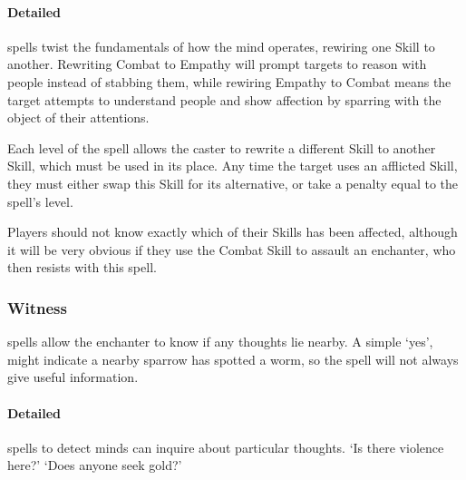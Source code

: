 \begin{multicols}{2}
\paragraph{Detailed}
spells twist the fundamentals of how the mind operates, rewiring one Skill to another.
Rewriting Combat to Empathy will prompt targets to reason with people instead of stabbing them, while rewiring Empathy to Combat means the target attempts to understand people and show affection by sparring with the object of their attentions.

Each level of the spell allows the caster to rewrite a different Skill to another Skill, which must be used in its place.
Any time the target uses an afflicted Skill, they must either swap this Skill for its alternative, or take a penalty equal to the spell's level.

Players should not know exactly which of their Skills has been affected, although it will be very obvious if they use the Combat Skill to assault an enchanter, who then resists with this spell.
\subsubsection{Witness}
spells allow the enchanter to know if any thoughts lie nearby.
A simple `yes', might indicate a nearby sparrow has spotted a worm, so the spell will not always give useful information.

\paragraph{Detailed}
spells to detect minds can inquire about particular thoughts.
`Is there violence here?'
`Does anyone seek gold?'

\end{multicols}
